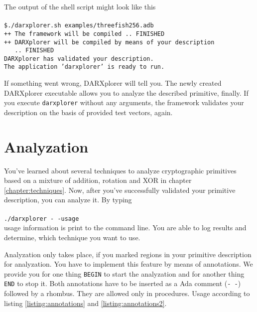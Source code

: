 \documentclass{acmtrans2m}
\begin{document}
The output of the shell script might look like this\\ \\
\noindent\hspace*{12mm}%
\texttt{\$./darxplorer.sh examples/threefish256.adb}\\
\noindent\hspace*{12mm}%
\texttt{++ The framework will be compiled .. FINISHED}\\
\noindent\hspace*{12mm}%
\texttt{++ DARXplorer will be compiled by means of your description}\\
\noindent\hspace*{12mm}%
\texttt{\ \ \  .. FINISHED}\\
\noindent\hspace*{12mm}%
\texttt{DARXplorer has validated your description.}\\
\noindent\hspace*{12mm}%
\texttt{The application 'darxplorer' is ready to run.}\\
\noindent\hspace*{12mm}%

If something went wrong, DARXplorer will tell you. The newly created DARXplorer executable allows you to analyze the described primitive, finally. If you execute \texttt{darxplorer} without any arguments, the framework validates your description on the basis of provided test vectors, again.


\section{Analyzation}
You've learned about several techniques to analyze cryptographic primitives based on 
a mixture of addition, rotation and XOR in chapter \ref{chapter:techniques}. Now, after
you've successfully validated your primitive description, you can analyze it. By typing\\ \\
\noindent\hspace*{12mm}%
\texttt{./darxplorer -\,-usage}\\

usage information is print to the command line. You are able to log results and
determine, which technique you want to use.

Analyzation only takes place, if you marked regions in your primitive description for
analyzation. You have to implement this feature by means of annotations. We provide
you for one thing \texttt{BEGIN} to start the analyzation and for another thing 
\texttt{END} to stop it. Both annotations have to be inserted as a Ada comment
(\texttt{-\,-}) followed by a rhombus. They are allowed only in procedures. Usage
according to listing \ref{listing:annotations} and \ref{listing:annotations2}.
\end{document}
